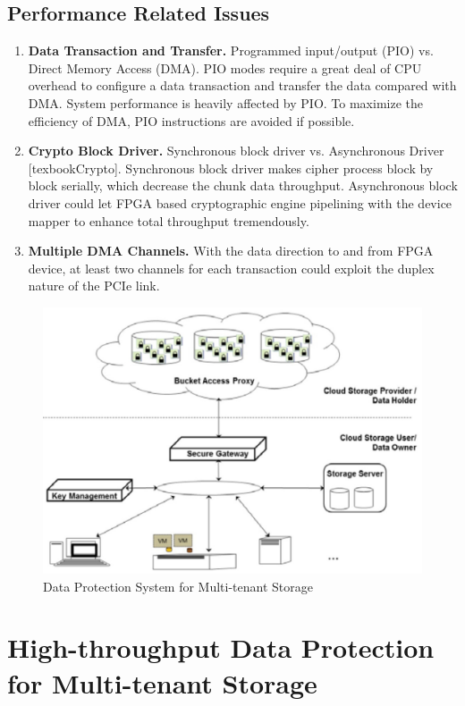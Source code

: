 \documentclass[10pt]{report}
\begin{document}
			\subsection{Performance Related Issues}	
				\begin{enumerate}
				\item \textbf{Data Transaction and Transfer.} Programmed input/output (PIO) vs. Direct Memory Access (DMA). PIO modes require a great deal of CPU overhead to configure a data transaction and transfer the data compared with DMA. System performance is heavily affected by PIO. To maximize the efficiency of DMA, PIO instructions are avoided if possible.
				\item \textbf{Crypto Block Driver.} Synchronous block driver vs. Asynchronous Driver [texbookCrypto]. Synchronous block driver makes cipher process block by block serially, which decrease the chunk data throughput. Asynchronous block driver could let FPGA based cryptographic engine pipelining with the device mapper to enhance total throughput tremendously.
				\item \textbf{Multiple DMA Channels. }With the data direction to and from FPGA device, at least two channels for each transaction could exploit the duplex nature of the PCIe link.
				\end{enumerate}
				\begin{figure}[ft]
				\includegraphics[width=\textwidth,height=\textheight,keepaspectratio] {fig1}
				\caption{Data Protection System for Multi-tenant Storage}
				\label{Figure 1}
				\end{figure}
		\section{High-throughput Data Protection for Multi-tenant Storage}
\end{document}
